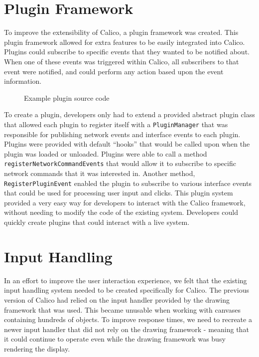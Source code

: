 \section{Plugin Framework}
To improve the extensibility of Calico, a plugin framework was created. This plugin framework allowed for extra features to be easily integrated into Calico. Plugins could subscribe to specific events that they wanted to be notified about. When one of these events was triggered within Calico, all subscribers to that event were notified, and could perform any action based upon the event information. 

\begin{figure}[htb]
  \centering
  \small
  
  \normalsize
  \caption{Example plugin source code}
  \label{fig:plugin_file}
\end{figure}

To create a plugin, developers only had to extend a provided abstract plugin class that allowed each plugin to register itself with a \texttt{PluginManager} that was responsible for publishing network events and interface events to each plugin. Plugins were provided with default ``hooks'' that would be called upon when the plugin was loaded or unloaded. Plugins were able to call a method \texttt{registerNetworkCommandEvents} that would allow it to subscribe to specific network commands that it was interested in. Another method, \texttt{RegisterPluginEvent} enabled the plugin to subscribe to various interface events that could be used for processing user input and clicks. This plugin system provided a very easy way for developers to interact with the Calico framework, without needing to modify the code of the existing system. Developers could quickly create plugins that could interact with a live system.




\section{Input Handling}
In an effort to improve the user interaction experience, we felt that the existing input handling system needed to be created specifically for Calico. The previous version of Calico had relied on the input handler provided by the drawing framework that was used. This became unusable when working with canvases containing hundreds of objects. To improve response times, we need to recreate a newer input handler that did not rely on the drawing framework - meaning that it could continue to operate even while the drawing framework was busy rendering the display.

